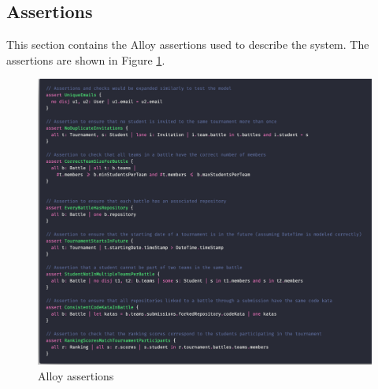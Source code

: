 \subsection{Assertions}
This section contains the Alloy assertions used to describe the system. The assertions are shown in Figure \ref{fig:alloy_assertions}.
\begin{figure}[H]
    \centering
    \includegraphics[width=1\textwidth]{Images/alloy_assertions.png}
    \caption{Alloy assertions}
    \label{fig:alloy_assertions}
\end{figure}